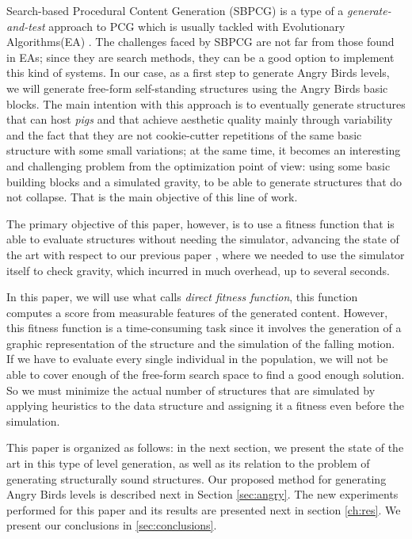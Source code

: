 \documentclass[a4paper,twoside]{article}
\begin{document}
Search-based Procedural Content Generation (SBPCG) is a type of a
\textit{generate-and-test} approach to PCG which is usually tackled
with Evolutionary Algorithms(EA) \cite{togelius2010search}. The
challenges faced by SBPCG are not far from those found in EAs; since
they are search methods, they can be a good option to implement this
kind of systems. In our case, as a first step to generate Angry Birds
levels, we will generate free-form self-standing structures using the Angry
Birds basic blocks. The main intention with this approach is to
eventually generate structures that can host {\em pigs} and that
achieve aesthetic quality mainly through variability and the fact that
they are not cookie-cutter repetitions of the same basic structure
with some small variations; at the same time,
it becomes an interesting and challenging problem from the
optimization point of view: using some basic building blocks and a
simulated gravity, to be able to generate structures that do not
collapse. That is the main objective of this line of work.

The primary objective of this paper, however, is to use a fitness function that is
able to evaluate structures without needing the simulator, advancing
the state of the art with respect to our previous paper
\cite{DBLP:conf/evoW/CalleGGV19anon}, where we needed to use the simulator
itself to check gravity, which incurred in much overhead, up to
several seconds.

In this paper, we will use what \cite{togelius2010search} calls {\em
  direct fitness function}, this function computes a score from
measurable features of the generated content. However, this fitness
function is a time-consuming task since it involves the generation of
a graphic representation of the structure and the simulation of the
falling motion. If we have to evaluate every single individual in the
population, we will not be able to cover enough of the free-form
search space to find a good enough solution. So we must minimize the
actual number of structures that are simulated by applying heuristics
to the data structure and assigning it a fitness even before the
simulation. 


This paper is organized as follows: in the next section, we present
the state of the art in this type of level generation, as well as its
relation to the problem of generating structurally sound
structures. Our proposed method for generating Angry Birds levels is
described next in Section \ref{sec:angry}. The new experiments
performed for this paper and its results are presented next in section
\ref{ch:res}. We present our conclusions in 
\ref{sec:conclusions}.
\end{document}
